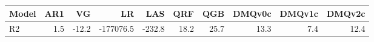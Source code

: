 \begin{tabular}{lrrrrrrrrr}
\toprule
Model & AR1 & VG & LR & LAS & QRF & QGB & DMQv0c & DMQv1c & DMQv2c \\
\midrule
R2 & 1.5 & -12.2 & -177076.5 & -232.8 & 18.2 & 25.7 & 13.3 & 7.4 & 12.4 \\
\bottomrule
\end{tabular}
